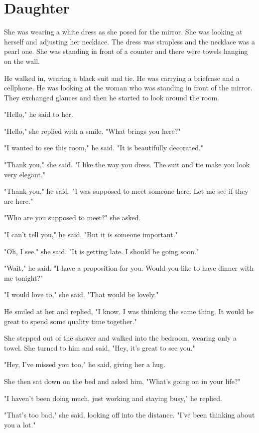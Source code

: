 \documentclass[smalldemyvopaper,11pt,twoside,onecolumn,openright,extrafontsizes]{memoir}
\begin{document}
\chapter{Daughter}
She was wearing a white dress as she posed for the mirror. She was looking at herself and adjusting her necklace. The dress was strapless and the necklace was a pearl one. She was standing in front of a counter and there were towels hanging on the wall.\par
He walked in, wearing a black suit and tie. He was carrying a briefcase and a cellphone. He was looking at the woman who was standing in front of the mirror. They exchanged glances and then he started to look around the room.\par
"Hello," he said to her.\par
"Hello," she replied with a smile. "What brings you here?"\par
"I wanted to see this room," he said. "It is beautifully decorated."\par
"Thank you," she said. "I like the way you dress. The suit and tie make you look very elegant."\par
"Thank you," he said. "I was supposed to meet someone here. Let me see if they are here."\par
"Who are you supposed to meet?" she asked.\par
"I can't tell you," he said. "But it is someone important."\par
"Oh, I see," she said. "It is getting late. I should be going soon."\par
"Wait," he said. "I have a proposition for you. Would you like to have dinner with me tonight?"\par
"I would love to," she said. "That would be lovely."\par
He smiled at her and replied, "I know. I was thinking the same thing. It would be great to spend some quality time together."\par
She stepped out of the shower and walked into the bedroom, wearing only a towel. She turned to him and said, "Hey, it's great to see you."\par
"Hey, I've missed you too," he said, giving her a hug.\par
She then sat down on the bed and asked him, "What's going on in your life?"\par
"I haven't been doing much, just working and staying busy," he replied.\par
"That's too bad," she said, looking off into the distance. "I've been thinking about you a lot."\par
\end{document}
